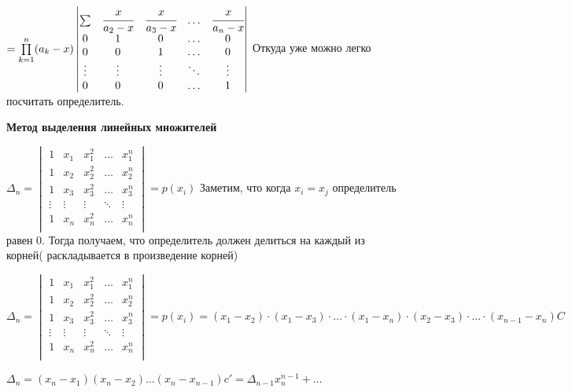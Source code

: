 \documentclass[twoside]{book}
\begin{document}
\(=
\prod\limits_{k=1}^n (a_k-x)
\begin{vmatrix}
    \sum   & \cfrac{x}{a_2-x} & \cfrac{x}{a_3-x} & \ldots & \cfrac{x}{a_n-x} \\
    0      & 1                & 0                & \ldots & 0                \\
    0      & 0                & 1                & \ldots & 0                \\
    \vdots & \vdots           & \vdots           & \ddots & \vdots           \\
    0      & 0                & 0                & \ldots & 1                \\
\end{vmatrix}
\)
Откуда уже можно легко посчитать определитель.

\textbf{Метод выделения линейных множителей}


\(
\Delta_n = \begin{vmatrix}
    1      & x_1    & x_1^2  & \ldots & x_1^n  \\
    1      & x_2    & x_2^2  & \ldots & x_2^n  \\
    1      & x_3    & x_3^2  & \ldots & x_3^n  \\
    \vdots & \vdots & \vdots & \ddots & \vdots \\
    1      & x_n    & x_n^2  & \ldots & x_n^n  \\
\end{vmatrix} = p(x_i)
\)
Заметим, что когда \(x_i  = x_j \) определитель равен 0. Тогда получаем, что определитель должен делиться на каждый из корней( раскладывается в произведение корней)

\(
\Delta_n = \begin{vmatrix}
    1      & x_1    & x_1^2  & \ldots & x_1^n  \\
    1      & x_2    & x_2^2  & \ldots & x_2^n  \\
    1      & x_3    & x_3^2  & \ldots & x_3^n  \\
    \vdots & \vdots & \vdots & \ddots & \vdots \\
    1      & x_n    & x_n^2  & \ldots & x_n^n  \\
\end{vmatrix} = p(x_i) = (x_1 - x_2) \cdot (x_1  - x_3) \cdot \ldots \cdot (x_1 - x_n) \cdot (x_2 - x_3) \cdot \ldots \cdot (x_{n-1}-x_n) C
\)

\(\Delta_n = (x_n - x_1)(x_n - x_2)\ldots(x_n - x_{n - 1}) c' = \Delta_{n - 1} x_n^{n - 1} + \ldots\)
\end{document}
